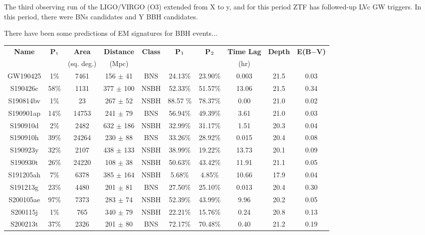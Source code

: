 The third observing run of the LIGO/VIRGO (O3) extended from X to y, and for this period ZTF has followed-up LVc GW triggers. In this period, there were BNs candidates and Y BBH candidates.

There have been some predictions of EM signatures for BBH events...

\begin{table}
	\centering
	\begin{tabular}{||c c c c c c c c c c||} 
		\hline
		\textbf{Name} & \textbf{P$_{\textup{t}}$} & \textbf{Area} & \textbf{Distance} & \textbf{Class} & \textbf{P$_{\textup{1}}$} & \textbf{P$_{\textup{2}}$} & \textbf{Time Lag} & \textbf{Depth} & \textbf{E(B$-$V)}\\
		&&(sq. deg.)&(Mpc)&&&&(hr)&&\\
		\hline
		GW190425 &  1\% & 7461  & 156 $\pm$ 41& BNS & 24.13\%  & 23.90\%  & 0.003& 21.5 & 0.03\\
		S190426c & 58\% & 1131  & 377 $\pm$ 100 & NSBH & 52.33\%  & 51.57\% & 13.06& 21.5 & 0.34\\
		S190814bv & 1\% & 23  & 267 $\pm$ 52 & NSBH & 88.57 \%  &  78.37\%  & 0.00 & 21.0 & 0.02\\ %
		S190901ap & 14\% & 14753  & 241 $\pm$ 79  & BNS & 56.94\% & 49.39\%  & 3.61& 21.0 & 0.03\\
		S190910d & 2\% & 2482 & 632 $\pm$ 186  & NSBH & 32.99\% & 31.17\%& 1.51& 20.3 & 0.04\\
		S190910h & 39\% & 24264 & 230 $\pm$ 88 & BNS & 33.26\%  & 28.92\% & 0.015& 20.4 & 0.08\\
		S190923y & 32\% & 2107  & 438 $\pm$ 133& NSBH & 38.99\%  & 19.22\% & 13.73& 20.1 & 0.09\\
		S190930t & 26\% & 24220  & 108 $\pm$ 38 & NSBH & 50.63\% & 43.42\% & 11.91& 21.1 & 0.05\\
		S191205ah & 7\% & 6378  & 385 $\pm$ 164  & NSBH & 5.68\% & 4.85\% & 10.66& 17.9 & 0.04\\
		S191213g & 23\% & 4480 & 201 $\pm$ 81  & BNS & 27.50\%  & 25.10\% & 0.013& 20.4 & 0.30\\
		S200105ae & 97\%& 7373  & 283 $\pm$ 74  & NSBH & 52.39\% & 43.99\%  & 9.96 & 20.2 & 0.05\\
		S200115j & 1\% & 765 & 340 $\pm$ 79 & NSBH & 22.21\% & 15.76\%  & 0.24 & 20.8 & 0.13\\
		S200213t & 37\% & 2326  & 201 $\pm$ 80& BNS & 72.17\% & 70.48\%  & 0.40 & 21.2 & 0.19\\
		\hline
	\end{tabular}

\end{table}
